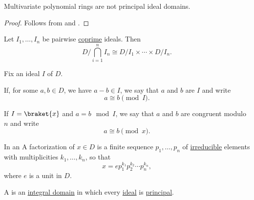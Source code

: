 \begin{corollary}\label{thm:multivariate_polynomial_rings_are_not_pid}
  Multivariate polynomial rings are not principal ideal domains.
\end{corollary}
\begin{proof}
  Follows from  and .
\end{proof}

\begin{theorem}\label{thm:chinese_remained_theorem}
  Let \( I_1, \ldots, I_n \) be pairwise \hyperref[def:coprime_ring_ideals]{coprime} ideals. Then
  \begin{equation*}
    D / \bigcap_{i=1}^n I_n \cong D / I_1 \times \cdots \times D / I_n.
  \end{equation*}
\end{theorem}

\begin{definition}\label{def:modulo}\mimprovised
  Fix an ideal \( I \) of \( D \).

  If, for some \( a, b \in D \), we have \( a - b \in I \), we say that \( a \) and \( b \) are  \( I \) and write
  \begin{equation*}
    a \cong b \pmod I.
  \end{equation*}

  If \( I = \braket{ x } \) and \( a = b \mod I \), we say that \( a \) and \( b \) are congruent modulo \( n \) and write
  \begin{equation*}
    a \cong b \pmod x.
  \end{equation*}
\end{definition}

\begin{definition}\label{def:factorization_in_ring}
  In an  A factorization of \( x \in D \) is a finite sequence \( p_1, \ldots, p_n \) of \hyperref[def:irreducible_ring_element]{irreducible} elements with multiplicities \( k_1, \ldots, k_n \), so that
  \begin{equation*}
    x = e p_1^{k_1} p_2^{k_2} \cdots p_n^{k_n},
  \end{equation*}
  where \( e \) is a unit in \( D \).
\end{definition}

\begin{definition}\label{def:principal_ideal_domain}
  A  is an \hyperref[def:integral_domain]{integral domain} in which every \hyperref[def:semiring_ideal]{ideal} is \hyperref[def:semiring_ideal/principal]{principal}.
\end{definition}

